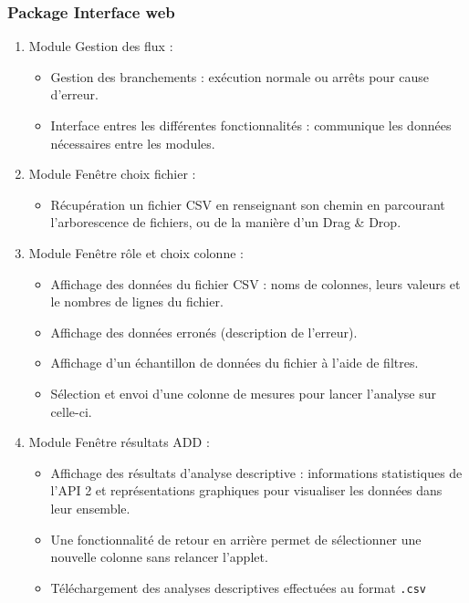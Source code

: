 			\subsubsection*{Package Interface web}
			\begin{enumerate}
				\item Module Gestion des flux :
					\begin{itemize}[leftmargin=*]
					\item Gestion des branchements : exécution normale ou arrêts pour cause d'erreur.
					\item Interface entres les différentes fonctionnalités : communique les données nécessaires entre les modules.
					\end{itemize}
				\item Module Fenêtre choix fichier :
					\begin{itemize}[leftmargin=*]
					\item Récupération un fichier CSV en renseignant son chemin en parcourant l'arborescence de fichiers, ou de la manière d'un Drag \& Drop.
					\end{itemize}
				\item Module Fenêtre rôle et choix colonne :
					\begin{itemize}[leftmargin=*]
					\item Affichage des données du fichier CSV : noms de colonnes, leurs valeurs et le nombres de lignes du fichier.
					\item Affichage des données erronés (description de l'erreur).
					\item Affichage d'un échantillon de données du fichier à l'aide de filtres.
					\item Sélection et envoi d'une colonne de mesures pour lancer l'analyse sur celle-ci. 
					\end{itemize}
				\item Module Fenêtre résultats ADD :
					\begin{itemize}[leftmargin=*]
					\item Affichage des résultats d'analyse descriptive : informations statistiques de l'API 2 et représentations graphiques pour visualiser les données dans leur ensemble.
					\item Une fonctionnalité de retour en arrière permet de sélectionner une nouvelle colonne sans relancer l'applet.
					\item Téléchargement des analyses descriptives effectuées au format \lstinline!.csv!
					\end{itemize}
				\end{enumerate}
		
